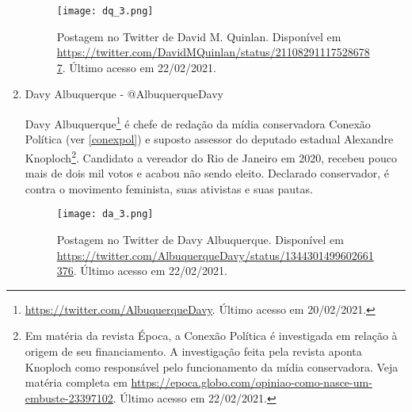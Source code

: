 \documentclass[
	12pt,				%
	openright,			%
	twoside,			%
	a4paper,			%
	english,			%
	brazil				%
	]{abntex2}
\begin{document}
\begin{anexosenv}
\begin{enumerate}
 
 
 
 \begin{figure}[!htbp]
    \centering
    \texttt{[image: dq\_3.png]}
    \caption{Postagem no Twitter de David M. Quinlan. Disponível em \url{https://twitter.com/DavidMQuinlan/status/211082911175286787}. Último acesso em 22/02/2021.}
 \end{figure}
 
 \newpage
 
 \item Davy Albuquerque - @AlbuquerqueDavy
 
 Davy Albuquerque\footnote{\url{https://twitter.com/AlbuquerqueDavy}. Último acesso em 20/02/2021.} é chefe de redação da mídia conservadora Conexão Política (ver \ref{conexpol}) e suposto assessor do deputado estadual Alexandre Knoploch\footnote{Em matéria da revista Época, a Conexão Política é investigada em relação à origem de seu financiamento. A investigação feita pela revista aponta Knoploch como responsável pelo funcionamento da mídia conservadora. Veja matéria completa em \url{https://epoca.globo.com/opiniao-como-nasce-um-embuste-23397102}. Último acesso em 22/02/2021.}. Candidato a vereador do Rio de Janeiro em 2020, recebeu pouco mais de dois mil votos e acabou não sendo eleito. Declarado conservador, é contra o movimento feminista, suas ativistas e suas pautas.
 
 \begin{figure}[!htbp]
    \centering
    \texttt{[image: da\_3.png]}
    \caption{Postagem no Twitter de Davy Albuquerque. Disponível em \url{https://twitter.com/AlbuquerqueDavy/status/1344301499602661376}. Último acesso em 22/02/2021.}
 \end{figure}
 

\end{enumerate}
\end{anexosenv}
\end{document}
